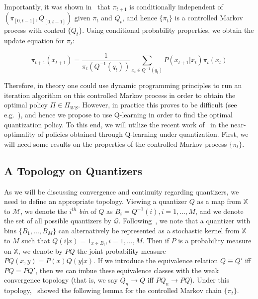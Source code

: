 \documentclass{article}
\begin{document}
Importantly, it was shown in~\cite{Wood} that \( \pi_{t+1} \) is conditionally independent of \( (\pi_{[0,t-1]}, Q_{[0,t-1]}) \) given \( \pi_t \) and \( Q_t \), and hence \( \{\pi_t\} \) is a controlled Markov process with control \( \{Q_t\} \). Using conditional probability properties, we obtain the update equation for \( \pi_t \):

\begin{equation}
    \pi_{t+1}(x_{t+1}) = \frac{1}{\pi_t(Q^{-1}(q_t))}\sum_{x_t \in Q^{-1}(q_t)}P(x_{t+1}|x_t)\pi_t(x_t)\label{eq:1}
\end{equation}

Therefore, in theory one could use dynamic programming principles to run an iteration algorithm on this controlled Markov process in order to obtain the optimal policy \( \Pi \in \Pi_{WS} \). However, in practice this proves to be difficult (see e.g.~\cite{Wood}), and hence we propose to use Q-learning in order to find the optimal quantization policy. To this end, we will utilize the recent work of~\cite{Kara} in the near-optimality of policies obtained through Q-learning under quantization. First, we will need some results on the properties of the controlled Markov process \( \{\pi_t\} \).

\subsection{A Topology on Quantizers}
As we will be discussing convergence and continuity regarding quantizers, we need to define an appropriate topology. Viewing a quantizer \( Q \) as a map from \( \mathbb{X} \) to \( \mathcal{M} \), we denote the \( i^{th} \) \emph{bin} of \( Q \) as \( B_i = Q^{-1}(i), i=1,\ldots,M \), and we denote the set of all possible quantizers by \( \mathcal{Q} \). Following~\cite{Linder}, we note that a quantizer with bins \( \{B_1,\ldots,B_M\} \) can alternatively be represented as a stochastic kernel from \( \mathbb{X} \) to \( M \) such that \( Q(i|x) = 1_{x \in B_i}, i=1,\ldots,M \). Then if \( P \) is a probability measure on \( \mathbb{X} \), we denote by \( PQ \) the joint probability measure \( PQ(x,y) = P(x)Q(y|x) \). If we introduce the equivalence relation \( Q \equiv Q' \) iff \( PQ = PQ' \), then we can imbue these equivalence classes with the weak convergence topology (that is, we say \( Q_n \to Q \) iff \( PQ_n \to PQ \)). Under this topology,~\cite{Linder} showed the following lemma for the controlled Markov chain \( \{\pi_t\} \).
\end{document}
